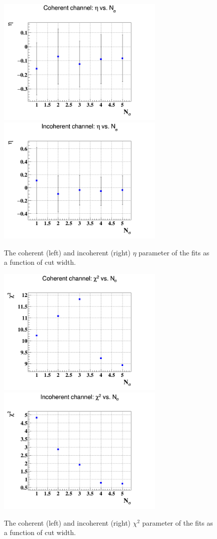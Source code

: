 \begin{figure}[h!]
   \includegraphics[height=6.2cm]{fig/coh_eta_Nsig.png}
   \includegraphics[height=6.2cm]{fig/incoh_eta_Nsig.png}
   \caption{The coherent (left) and incoherent (right) $\eta$ parameter of the 
fits as a function of cut width.  }
\label{fig:sys_fit_eta}
\end{figure}

\begin{figure}[h!]
   \includegraphics[height=6.2cm]{fig/coh_chi2_Nsig.png}
   \includegraphics[height=6.2cm]{fig/incoh_chi2_Nsig.png}
   \caption{The coherent (left) and incoherent (right) $\chi^{2}$ parameter of 
the fits as a function of cut width.}
\label{fig:sys_fit_chi2}
\end{figure}


